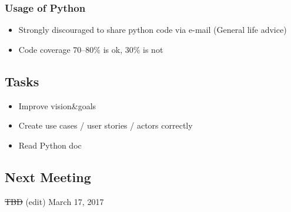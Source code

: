 	\subsubsection{Usage of Python}
	\begin{itemize}
		\item Strongly discouraged to share python code via e-mail (General life advice)
		\item Code coverage 70--80\% is ok, 30\% is not
        \end{itemize}
\subsection*{Tasks}
	\begin{itemize}
		\item Improve vision\&goals
		\item Create use cases / user stories / actors correctly
		\item Read Python doc
	\end{itemize}
\subsection*{Next Meeting}
\st{TBD} (edit)
March 17, 2017
